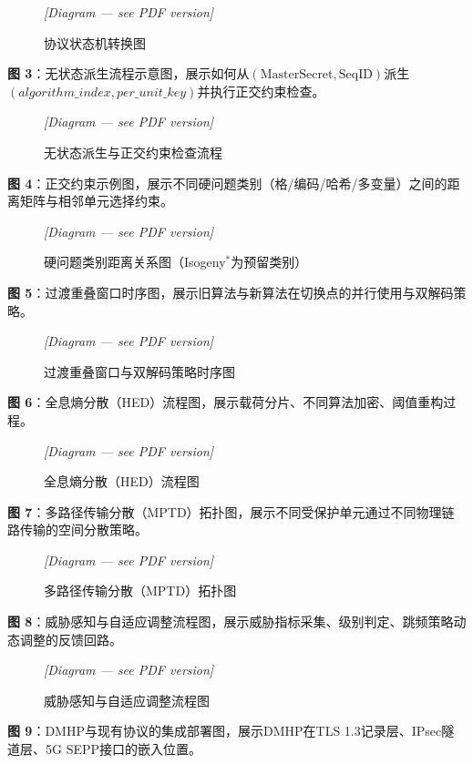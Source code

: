 ﻿\documentclass[12pt,a4paper]{article}
\begin{document}
\begin{figure}[H]
\centering
\textit{[Diagram — see PDF version]}
\caption{协议状态机转换图}
\end{figure}

\textbf{图 3}：无状态派生流程示意图，展示如何从$(\text{MasterSecret}, \mathrm{SeqID})$派生$(algorithm\_index, per\_unit\_key)$并执行正交约束检查。

\begin{figure}[H]
\centering
\textit{[Diagram — see PDF version]}
\caption{无状态派生与正交约束检查流程}
\end{figure}

\textbf{图 4}：正交约束示例图，展示不同硬问题类别（格/编码/哈希/多变量）之间的距离矩阵与相邻单元选择约束。

\begin{figure}[H]
\centering
\textit{[Diagram — see PDF version]}
\caption{硬问题类别距离关系图（Isogeny$^*$为预留类别）}
\end{figure}

\textbf{图 5}：过渡重叠窗口时序图，展示旧算法与新算法在切换点的并行使用与双解码策略。

\begin{figure}[H]
\centering
\textit{[Diagram — see PDF version]}
\caption{过渡重叠窗口与双解码策略时序图}
\end{figure}

\textbf{图 6}：全息熵分散（HED）流程图，展示载荷分片、不同算法加密、阈值重构过程。

\begin{figure}[H]
\centering
\textit{[Diagram — see PDF version]}
\caption{全息熵分散（HED）流程图}
\end{figure}

\textbf{图 7}：多路径传输分散（MPTD）拓扑图，展示不同受保护单元通过不同物理链路传输的空间分散策略。

\begin{figure}[H]
\centering
\textit{[Diagram — see PDF version]}
\caption{多路径传输分散（MPTD）拓扑图}
\end{figure}

\textbf{图 8}：威胁感知与自适应调整流程图，展示威胁指标采集、级别判定、跳频策略动态调整的反馈回路。

\begin{figure}[H]
\centering
\textit{[Diagram — see PDF version]}
\caption{威胁感知与自适应调整流程图}
\end{figure}

\textbf{图 9}：DMHP与现有协议的集成部署图，展示DMHP在TLS 1.3记录层、IPsec隧道层、5G SEPP接口的嵌入位置。
\end{document}
